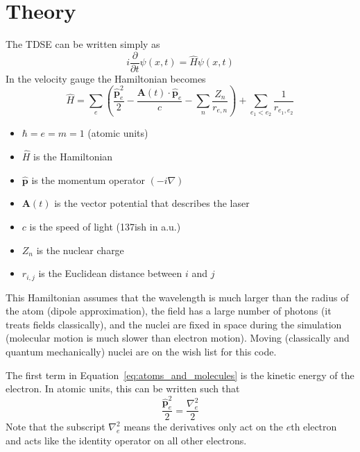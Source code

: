 \documentclass{article}
\begin{document}

\section{Theory} %
\label{sec:theory}

The TDSE can be written simply as
\begin{equation}
    i\frac{\partial}{\partial t}\psi(x,t) = \hat{H}\psi(x,t)
\end{equation}
In the velocity gauge the Hamiltonian becomes
\begin{equation}
    \label{eq:atoms_and_molecules}
    \hat{H} = \sum_{e}\left(\frac{\hat{\mathbf{p}}^2_e}{2} - \frac{\mathbf{A}(t) \cdot \hat{\mathbf{p}}_e}{c} - \sum_{n} \frac{Z_n}{r_{e,n}}\right) + \sum_{e_1 < e_2}\frac{1}{r_{e_1, e_2}}
\end{equation}
\begin{itemize}
    \item $\hbar=e=m=1$ (atomic units)
    \item $\hat{H}$ is the Hamiltonian
    \item $\hat{\mathbf{p}}$ is the momentum operator $(-i\nabla)$
    \item $\mathbf{A}(t)$ is the vector potential that describes the laser
    \item $c$ is the speed of light (137ish in a.u.)
    \item $Z_n$ is the nuclear charge
    \item $r_{i,j}$ is the Euclidean distance between $i$ and $j$
\end{itemize}
This Hamiltonian assumes that the wavelength is much larger than the radius of the atom (dipole approximation), the field has a large number of photons (it treats fields classically), and the nuclei are fixed in space during the simulation (molecular motion is much slower than electron motion). Moving (classically and quantum mechanically) nuclei are on the wish list for this code.

The first term in Equation~\ref{eq:atoms_and_molecules} is the kinetic energy of the electron. In atomic units, this can be written such that
\begin{equation}
  \frac{\hat{\mathbf{p}}^2_e}{2} = \frac{\nabla_e^2}{2}
\end{equation}
Note that the subscript $\nabla_e^2$ means the derivatives only act on the $e$th electron and acts like the identity operator on all other electrons.
\end{document}
